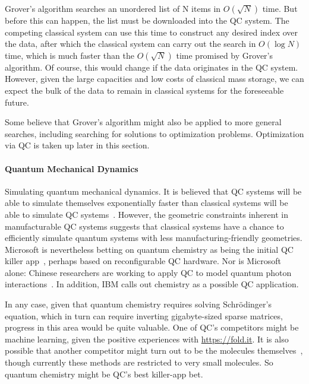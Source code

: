 Grover's algorithm searches an unordered list of N items
in $O(\sqrt N)$ time.
But before this can happen, the list must be downloaded into
the QC system.
The competing classical system can use this time to construct
any desired index over the data, after which the classical
system can carry out the search in $O(\log N)$ time, which
is much faster than the $O(\sqrt N)$ time promised by
Grover's algorithm.
Of course, this would change if the data originates in the
QC system.
However, given the large capacities and low costs of
classical mass storage, we can expect the bulk of the data to remain
in classical systems for the foreseeable future.

Some believe that Grover's algorithm might also be applied to more general
searches, including searching for solutions to optimization problems.
Optimization via QC is taken up later in this section.

\paragraph{Quantum Mechanical Dynamics}
\label{sec:future:Quantum Mechanical Dynamics}

Simulating quantum mechanical dynamics.
It is believed that QC systems will be able to simulate themselves
exponentially faster than classical systems will be able to
simulate QC systems~\cite{Feynman1982}.
However, the geometric constraints inherent in manufacturable
QC systems suggests that classical systems have a chance
to efficiently simulate quantum systems with less
manufacturing-friendly geometries.
Microsoft is nevertheless betting on quantum chemistry as being
the initial QC killer app~\cite{TomSimonite2017QC-MS-Chemistry},
perhaps based on reconfigurable QC hardware.
Nor is Microsoft alone: Chinese researchers are working to apply
QC to model quantum photon interactions~\cite{StephenChen2017ChinaQC}.
In addition, IBM calls out chemistry as a possible QC application.

In any case, given that quantum chemistry requires solving
Schr\"{o}dinger's equation, which in turn can require inverting
gigabyte-sized sparse matrices, progress in this area would
be quite valuable.
One of QC's competitors might be machine learning, given the positive
experiences with \url{https://fold.it}.
It is also possible that another competitor might turn out to be the
molecules themselves~\cite{Chin-wenChou2017ManipulateMolecule}, though
currently these methods are restricted to very small molecules.
So quantum chemistry might be QC's best killer-app bet.

